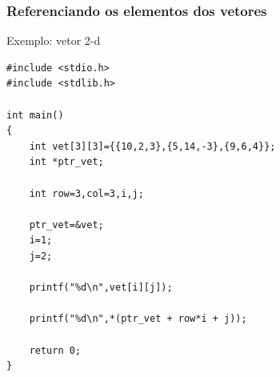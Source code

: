 \begin{frame}[fragile]
  \frametitle{Referenciando os elementos dos vetores}

  \begin{block}{Exemplo: vetor 2-d}
  \begin{lstlisting}
#include <stdio.h>
#include <stdlib.h>

int main()
{
    int vet[3][3]={{10,2,3},{5,14,-3},{9,6,4}};
    int *ptr_vet;

    int row=3,col=3,i,j;

    ptr_vet=&vet;
    i=1;
    j=2;

    printf("%d\n",vet[i][j]);

    printf("%d\n",*(ptr_vet + row*i + j));

    return 0;
}

  \end{lstlisting}
  \end{block}
\end{frame}